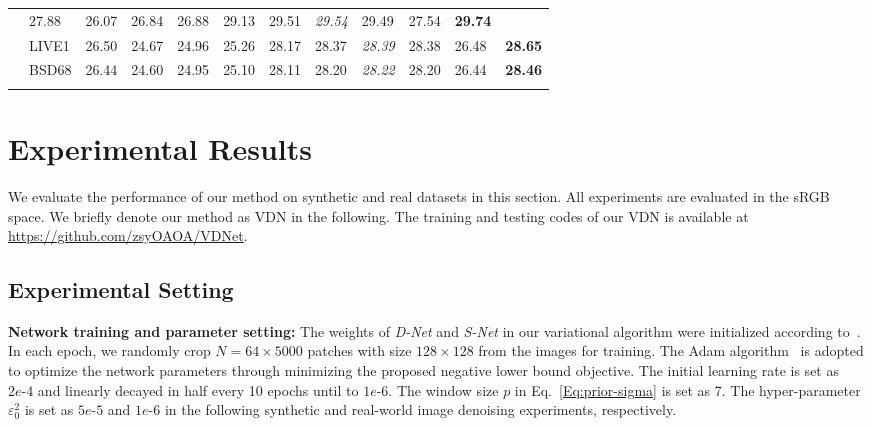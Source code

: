 \documentclass{article}
\begin{document}
\begin{table}[t]
\begin{tabular}{@{}C{1.0cm}@{}|@{}C{1.2cm}@{}|@{}C{1.1cm}@{}@{}C{1.1cm}@{}@{}C{1.1cm}@{}
        @{}C{1.0cm}@{}@{}C{1.0cm}@{}@{}C{1.5cm}@{}@{}C{1.3cm}@{}@{}C{1.3cm}@{}@{}C{1.1cm}@{}@{}C{1.2cm}@{}}
                    & 27.88 &26.07   &26.84  &26.88  &29.13     & 29.51   &\textit{29.54}  &29.49  &27.54  &\textbf{29.74} \\
        &  LIVE1    & 26.50 &24.67   &24.96  &25.26  &28.17     & 28.37   &\textit{28.39}  &28.38  &26.48  &\textbf{28.65}   \\
        &  BSD68    & 26.44 &24.60   &24.95  &25.10  &28.11     & 28.20   &\textit{28.22}  &28.20  &26.44  &\textbf{28.46}   \\
        \Xhline{0.8pt}
    \end{tabular}
    \label{tab:psnr_noniid}
    \vspace{-2mm}
\end{table}

\vspace{-2mm}\section{Experimental Results}\vspace{-2mm}
We evaluate the performance of our method on synthetic and real datasets in this section. All experiments
are evaluated in the sRGB space. We briefly denote our method as VDN in the following. The training and
testing codes of our VDN is available at \url{https://github.com/zsyOAOA/VDNet}.

\vspace{-2mm}\subsection{Experimental Setting}\vspace{-2mm}
\textbf{Network training and parameter setting:} The weights of \textit{D-Net} and \textit{S-Net} in our variational
algorithm were initialized according to~\cite{he2015delving}. In each epoch, we randomly crop $N=64\times 5000$ patches
with size $128\times 128$ from the images for training. The Adam algorithm~\cite{Kingma2015} is adopted to
optimize the network parameters through minimizing the proposed negative lower bound objective. The initial learning
rate is set as $2e\text{-}4$ and linearly decayed in half every 10 epochs until to $1e\text{-}6$.
The window size $p$ in Eq.~\eqref{Eq:prior-sigma} is set as 7. The hyper-parameter $\varepsilon_0^2$ is set as
$5e\text{-}5$ and $1e\text{-}6$ in the following synthetic and real-world image denoising experiments, respectively.
\end{document}
